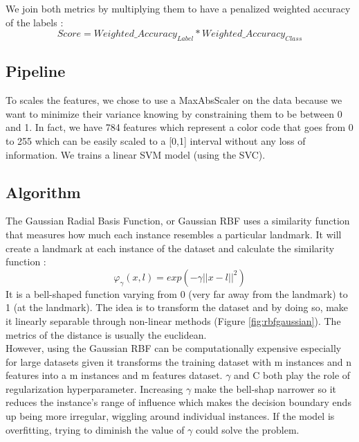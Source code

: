 We join both metrics by multiplying them to have a penalized weighted accuracy of the labels : 
\begin{equation*}
	Score  = Weighted\_Accuracy_{Label} *  Weighted\_Accuracy_{Class}
\end{equation*}



\subsection{Pipeline}
To scales the features, we chose to use a MaxAbsScaler on the data because we want to minimize their variance knowing by constraining them to be between 0 and 1. In fact, we have 784 features which represent a color code that goes from 0 to 255 which can be easily scaled to a [0,1] interval without any loss of information. We trains a linear SVM model (using the SVC). 

\subsection{Algorithm}
The Gaussian Radial Basis Function, or Gaussian RBF uses a similarity function that measures how much each instance resembles a particular landmark. It will create a landmark at each instance of the dataset and calculate the similarity function :  
\begin{equation} \varphi_\gamma(x,l)= exp (-\gamma ||x-l||^2) \end{equation}
It is a bell-shaped function varying from 0 (very far away from the landmark) to 1 (at the landmark). The idea is to transform the dataset and by doing so, make it linearly separable through non-linear methods (Figure \ref{fig:rbfgaussian}).
The metrics of the distance is usually the euclidean. \\


However, using the Gaussian RBF can be computationally expensive especially for large datasets given it transforms the training dataset with m instances and n features into a m instances and m features dataset.
$\gamma$ and C both play the role of regularization hyperparameter. Increasing $\gamma$ make the bell-shap narrower so it reduces the instance's range of influence which makes the decision boundary ends up being more irregular, wiggling around individual instances.
If the model is overfitting, trying to diminish the value of $\gamma$ could solve the problem.